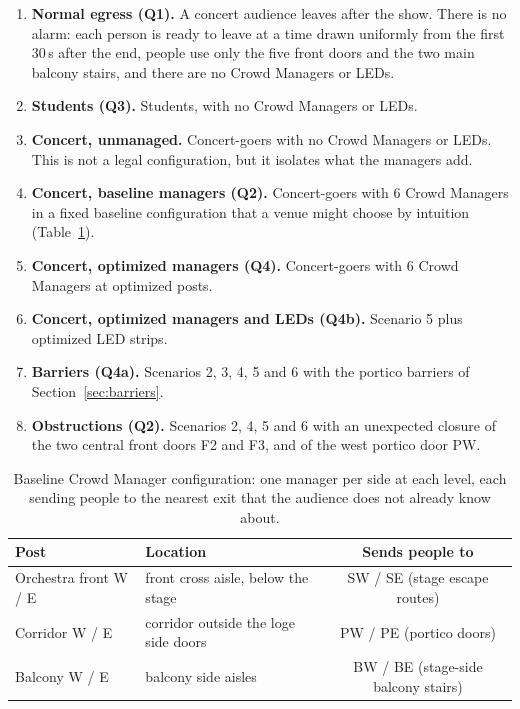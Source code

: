 \documentclass{article}
\begin{document}
\begin{enumerate}
    \item \textbf{Normal egress (Q1).} A concert audience leaves after the show. There is no alarm: each person is ready to leave at a time drawn uniformly from the first 30\,s after the end, people use only the five front doors and the two main balcony stairs, and there are no Crowd Managers or LEDs.
    \item \textbf{Students (Q3).} Students, with no Crowd Managers or LEDs.
    \item \textbf{Concert, unmanaged.} Concert-goers with no Crowd Managers or LEDs. This is not a legal configuration, but it isolates what the managers add.
    \item \textbf{Concert, baseline managers (Q2).} Concert-goers with 6 Crowd Managers in a fixed baseline configuration that a venue might choose by intuition (Table~\ref{tab:baseline_posts}).
    \item \textbf{Concert, optimized managers (Q4).} Concert-goers with 6 Crowd Managers at optimized posts.
    \item \textbf{Concert, optimized managers and LEDs (Q4b).} Scenario 5 plus optimized LED strips.
    \item \textbf{Barriers (Q4a).} Scenarios 2, 3, 4, 5 and 6 with the portico barriers of Section~\ref{sec:barriers}.
    \item \textbf{Obstructions (Q2).} Scenarios 2, 4, 5 and 6 with an unexpected closure of the two central front doors F2 and F3, and of the west portico door PW.
\end{enumerate}

\begin{table}[H]
    \centering
    \begin{tabular}{llc}
        \toprule
        \textbf{Post} & \textbf{Location} & \textbf{Sends people to} \\
        \midrule
        Orchestra front W / E & front cross aisle, below the stage & SW / SE (stage escape routes)\\
        Corridor W / E & corridor outside the loge side doors & PW / PE (portico doors)\\
        Balcony W / E & balcony side aisles & BW / BE (stage-side balcony stairs)\\
        \bottomrule
    \end{tabular}
    \caption{Baseline Crowd Manager configuration: one manager per side at each level, each sending people to the nearest exit that the audience does not already know about.}
    \label{tab:baseline_posts}
\end{table}
\end{document}
